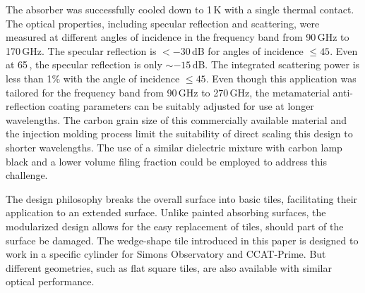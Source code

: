 The absorber was successfully cooled down to 1\,K with a single thermal contact. The optical properties, including specular reflection and scattering, were measured at different angles of incidence in the frequency band from 90\,GHz to 170\,GHz. The specular reflection is $< -30$\,dB for angles of incidence $\leq45$\dg{}. Even at 65\,\dg{}, the specular reflection is only $\sim-15$\,dB. The integrated scattering power is less than 1\% with the angle of incidence $\leq45$\dg{}. Even though this application was tailored for the frequency band from 90\,GHz to 270\,GHz, the metamaterial anti-reflection coating parameters can be suitably adjusted for use at longer wavelengths. The carbon grain size of this commercially available material and the injection molding process limit the suitability of direct scaling this design to shorter wavelengths. The use of a similar dielectric mixture with carbon lamp black and a lower volume filing fraction could be employed to address this challenge.

The design philosophy breaks the overall surface into basic tiles, facilitating their application to an extended surface. Unlike painted absorbing surfaces, the modularized design allows for the easy replacement of tiles, should part of the surface be damaged. The wedge-shape tile introduced in this paper is designed to work in a specific cylinder for Simons Observatory and CCAT-Prime. But different geometries, such as flat square tiles, are also available with similar optical performance.
